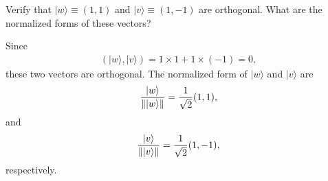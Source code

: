 \documentclass[en]{sol-man}
\begin{document}
\begin{exe}
    Verify that $\lvert w\rangle\equiv(1,1)$ and $\lvert v\rangle\equiv(1,-1)$ are orthogonal. What are the normalized forms of these vectors?
\end{exe}
\begin{sol}
    Since
    \begin{align}
        (\lvert w\rangle,\lvert v\rangle)=1\times 1+1\times(-1)=0,
    \end{align}
    these two vectors are orthogonal. The normalized form of $\lvert w\rangle$ and $\lvert v\rangle$ are
    \begin{align}
        \frac{\lvert w\rangle}{\left\lVert\lvert w\rangle\right\rVert}=\frac{1}{\sqrt{2}}(1,1),
    \end{align}
    and
    \begin{align}
        \frac{\lvert v\rangle}{\left\lVert\lvert v\rangle\right\rVert}=\frac{1}{\sqrt{2}}(1,-1),
    \end{align}
    respectively.
\end{sol}
\end{document}
